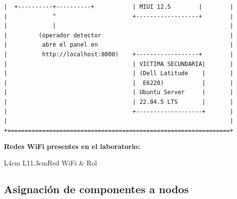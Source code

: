 \documentclass[11pt,a4paper]{article}
\begin{document}
\begin{verbatim}
|  +----------+----------+           | MIUI 12.5        |        |
|             ^                      +------------------+        |
|             |                                                  |
|         (operador detector                                     |
|          abre el panel en                                      |
|          http://localhost:8000)    +------------------+        |
|                                    | VICTIMA SECUNDARIA|       |
|                                    | (Dell Latitude    |       |
|                                    |  E6220)           |       |
|                                    | Ubuntu Server     |       |
|                                    | 22.04.5 LTS       |       |
|                                    +-------------------+       |
|                                                                |
+================================================================+
\end{verbatim}

\textbf{Redes WiFi presentes en el laboratorio:}

\begin{datatable}{L{4cm} L{11.3cm}}{Red WiFi & Rol}
\end{datatable}

\subsection{Asignación de componentes a nodos}
\end{document}

